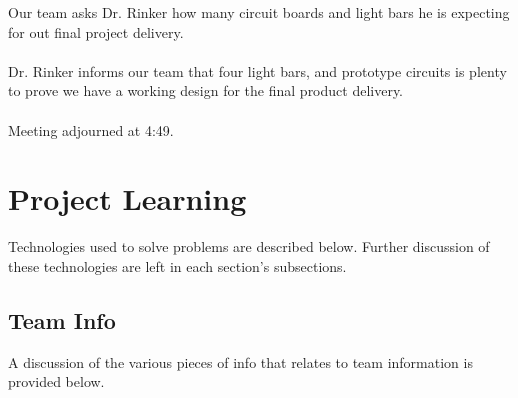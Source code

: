 \documentclass[12pt]{article}
\begin{document}
		\noindent		
		Our team asks Dr. Rinker how many circuit boards and light bars he is 					expecting for out final project delivery.\\
		\\
		\noindent
		Dr. Rinker informs our team that four light bars, and prototype circuits is 			plenty to prove we have a working design for the final product delivery.
		\\\\
		
		\noindent
		Meeting adjourned at 4:49.
		\clearpage
	
\section{Project Learning}
	Technologies used to solve problems are described below. Further discussion of these technologies are left in each section's subsections.

	\subsection{Team Info}
	 A discussion of the various pieces of info that relates to team information is provided below.
	
\end{document}
